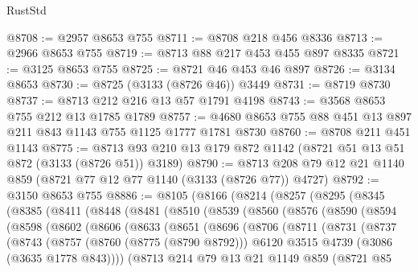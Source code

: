 \begin{lexlean}{RustStd}
\begin{coremodule}
@8708 := @2957 @8653 @755
@8711 := @8708 @218 @456 @8336
@8713 := @2966 @8653 @755
@8719 := @8713 @88 @217 @453 @455 @897 @8335
@8721 := @3125 @8653 @755
@8725 := @8721 @46 @453 @46 @897
@8726 := @3134 @8653
@8730 := @8725 (@3133 (@8726 @46)) @3449
@8731 := @8719 @8730
@8737 := @8713 @212 @216 @13 @57 @1791 @4198
@8743 := @3568 @8653 @755 @212 @13 @1785 @1789
@8757 := @4680 @8653 @755 @88 @451 @13 @897 @211 @843 @1143 @755 @1125 @1777 @1781 @8730
@8760 := @8708 @211 @451 @1143
@8775 := @8713 @93 @210 @13 @179 @872 @1142 (@8721 @51 @13 @51 @872 (@3133 (@8726 @51)) @3189)
@8790 := @8713 @208 @79 @12 @21 @1140 @859 (@8721 @77 @12 @77 @1140 (@3133 (@8726 @77)) @4727)
@8792 := @3150 @8653 @755
@8886 := @8105
    (@8166
      (@8214
        (@8257
          (@8295
            (@8345
              (@8385
                (@8411
                  (@8448
                    (@8481
                      (@8510
                        (@8539
                          (@8560
                            (@8576
                              (@8590
                                (@8594
                                  (@8598
                                    (@8602
                                      (@8606
                                        (@8633
                                          (@8651
                                            (@8696
                                              (@8706
                                                (@8711
                                                  (@8731
                                                    (@8737
                                                      (@8743
                                                        (@8757
                                                          (@8760 (@8775 (@8790 @8792)))
                                                          @6120
                                                          @3515
                                                          @4739
                                                          (@3086 (@3635 @1778 @843))))
                                                      (@8713
                                                        @214
                                                        @79
                                                        @13
                                                        @21
                                                        @1149
                                                        @859
                                                        (@8721
                                                          @85

\end{coremodule}
\end{lexlean}
